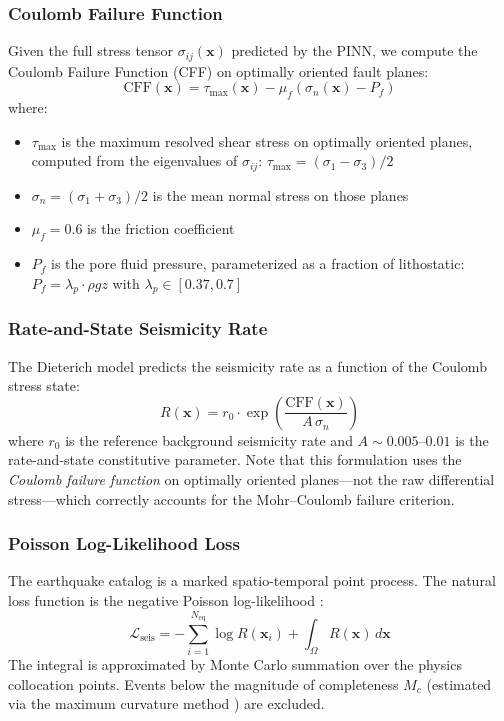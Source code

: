 \documentclass[11pt, a4paper]{article}
\begin{document}
\subsubsection{Coulomb Failure Function}
Given the full stress tensor $\sigma_{ij}(\mathbf{x})$ predicted by the PINN, we compute the Coulomb Failure Function (CFF) on optimally oriented fault planes:
\begin{equation}
    \text{CFF}(\mathbf{x}) = \tau_{\max}(\mathbf{x}) - \mu_f \left(\sigma_n(\mathbf{x}) - P_f\right)
    \label{eq:cff}
\end{equation}
where:
\begin{itemize}
    \item $\tau_{\max}$ is the maximum resolved shear stress on optimally oriented planes, computed from the eigenvalues of $\sigma_{ij}$: $\tau_{\max} = (\sigma_1 - \sigma_3)/2$
    \item $\sigma_n = (\sigma_1 + \sigma_3)/2$ is the mean normal stress on those planes
    \item $\mu_f = 0.6$ is the friction coefficient \cite{Byerlee1978}
    \item $P_f$ is the pore fluid pressure, parameterized as a fraction of lithostatic: $P_f = \lambda_p \cdot \rho g z$ with $\lambda_p \in [0.37, 0.7]$
\end{itemize}

\subsubsection{Rate-and-State Seismicity Rate}
The Dieterich \cite{Dieterich1994} model predicts the seismicity rate as a function of the Coulomb stress state:
\begin{equation}
    R(\mathbf{x}) = r_0 \cdot \exp\!\left(\frac{\text{CFF}(\mathbf{x})}{A\,\sigma_n}\right)
    \label{eq:dieterich}
\end{equation}
where $r_0$ is the reference background seismicity rate and $A \sim 0.005$--$0.01$ is the rate-and-state constitutive parameter. Note that this formulation uses the \textit{Coulomb failure function} on optimally oriented planes---not the raw differential stress---which correctly accounts for the Mohr--Coulomb failure criterion.

\subsubsection{Poisson Log-Likelihood Loss}
The earthquake catalog is a marked spatio-temporal point process. The natural loss function is the negative Poisson log-likelihood \cite{Ogata1998}:
\begin{equation}
    \mathcal{L}_{\text{seis}} = -\sum_{i=1}^{N_{\text{eq}}} \log R(\mathbf{x}_i) + \int_\Omega R(\mathbf{x})\,d\mathbf{x}
    \label{eq:poisson}
\end{equation}
The integral is approximated by Monte Carlo summation over the physics collocation points. Events below the magnitude of completeness $M_c$ (estimated via the maximum curvature method \cite{Wiemer2000}) are excluded.
\end{document}
